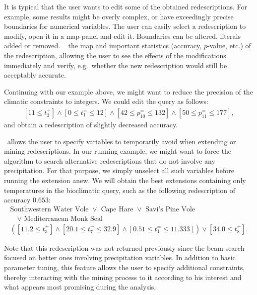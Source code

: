  It is typical that the user wants to
edit some of the obtained redescriptions. For example, some results
might be overly complex, or have exceedingly precise boundaries for
numerical variables. The user can easily select a redescription to
modify, open it in a map panel and edit it. Boundaries can be altered,
literals added or removed. \Siren\  the map and important
statistics (accuracy, $p$-value, etc.) of the redescription, allowing
the user to see the effects of the modifications immediately and
verify, e.g.\ whether the new redescription would still be acceptably
accurate.

Continuing with our example above, we might want to reduce the
precision of the climatic constraints to integers. We could edit the
query as follows:
\begin{equation*}
\begin{array}{l}
[11 \leq t_{3}^{+}] \land  [0 \leq t_{1}^{=} \leq 12]%
\land  [42 \leq p_{10}^{=} \leq 132] \land [50 \leq p_{11}^{=} \leq 177],
\end{array}
\end{equation*}
and obtain a redescription of slightly decreased accuracy. %

\Siren\ allows the user to specify variables to temporarily 
avoid when extending or mining redescriptions.
In our running example, we might want to force the
algorithm to search alternative redescriptions that do not involve any
 precipitation. For that purpose, we simply unselect all such
variables before running the extension anew. We will obtain the best
extensions containing only temperatures in the bioclimatic query, such
as the following redescription of accuracy $0.653$:
\begin{equation*}
\begin{array}{l}
\text{Southwestern Water Vole }\lor\text{ Cape Hare }\lor\text{ Savi's Pine Vole }\\[1mm]
\quad\lor\text{ Mediterranean Monk Seal}\\[3mm]
( [11.2 \leq t_{3}^{+}] \land  [20.1 \leq t_{7}^{+} \leq 32.9] %
\land  [0.51 \leq t_{1}^{=} \leq 11.333]) \lor  [34.0 \leq t_{8}^{+}].
\end{array}
\end{equation*}

Note that this redescription was not returned previously since the
beam search focused on better ones involving precipitation variables.
In addition to basic parameter tuning, this feature allows the user to specify additional constraints,
thereby interacting with the mining process to  it according to his interest and
what appears most promising during the analysis.

